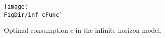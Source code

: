 \hypertarget{inf_cFunc}{}
\begin{figure}[tbp]
\centerline{\texttt{[image: \\FigDir/inf\_cFunc]}}
\caption{Optimal consumption $c$ in the infinite horizon model.}
\label{fig:inf_cFunc}
\end{figure}